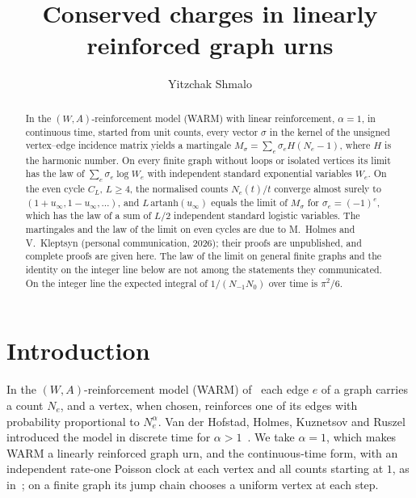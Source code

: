 \documentclass[11pt]{amsart}
\title{Conserved charges in linearly reinforced graph urns}
\author{Yitzchak Shmalo}
\theoremstyle{remark}\newtheorem{remark}[theorem]{Remark}
\begin{document}
\begin{abstract}
In the $(W,A)$-reinforcement model (WARM) with linear reinforcement, $\alpha=1$, in continuous time, started from unit counts, every vector $\sigma$ in the kernel of the unsigned vertex--edge incidence
matrix yields a martingale $M_\sigma=\sum_e\sigma_e H(N_e-1)$, where $H$ is the harmonic number. On every finite graph without loops or isolated vertices
its limit has the law of $\sum_e\sigma_e\log W_e$ with independent standard exponential variables $W_e$. On the even
cycle $C_L$, $L\ge4$, the normalised counts $N_e(t)/t$ converge almost surely to $(1+u_\infty,1-u_\infty,\dots)$, and $L\,\mathrm{artanh}(u_\infty)$ equals the
limit of $M_\sigma$ for $\sigma_e=(-1)^e$, which has the law of a sum of $L/2$ independent standard logistic
variables. The martingales and the law of the limit on even cycles are due to M.~Holmes and V.~Kleptsyn
(personal communication, 2026); their proofs are unpublished, and complete proofs are given here. The law of the limit on general finite graphs and the identity on the integer line below are not among the statements they communicated. On the integer line the expected integral of $1/(N_{-1}N_0)$ over time is $\pi^2/6$.
\end{abstract}
\maketitle

\section{Introduction}\label{sec:intro}
In the $(W,A)$-reinforcement model (WARM) of~\cite{HHKR} each edge $e$ of a graph carries a count $N_e$, and a vertex, when chosen, reinforces one of its edges with
probability proportional to $N_e^\alpha$. Van der Hofstad, Holmes, Kuznetsov and Ruszel introduced the model in discrete
time for $\alpha>1$~\cite{HHKR}. We take $\alpha=1$, which makes WARM a linearly reinforced graph urn, and the continuous-time form, with an independent rate-one Poisson
clock at each vertex and all counts starting at $1$, as in~\cite[Section~1]{HHKtree}; on a finite graph its jump chain
chooses a uniform vertex at each step.
\end{document}
